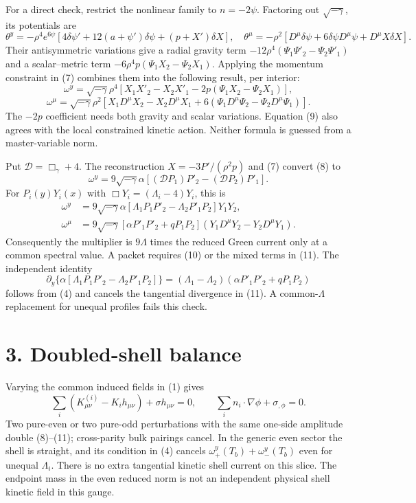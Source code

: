 \documentclass[
  11pt,
]{article}
\begin{document}
For a direct check, restrict the nonlinear family to \(n=-2\psi\).
Factoring out \(\sqrt{-\gamma}\), its potentials are \[
 \theta^y=-\rho^4e^{6\psi}
 [4\delta\psi'+12(a+\psi')\delta\psi+(p+X')\delta X],
 \quad
 \theta^\mu=-\rho^2[D^\mu\delta\psi
                  +6\delta\psi D^\mu\psi+D^\mu X\delta X].
\] Their antisymmetric variations give a radial gravity term
\(-12\rho^4(\Psi_1\Psi'_2-\Psi_2\Psi'_1)\) and a scalar--metric term
\(-6\rho^4p(\Psi_1X_2-\Psi_2X_1)\). Applying the momentum constraint in
(7) combines them into the following result, per interior: \[
 \boxed{\omega^y=\sqrt{-\gamma}\rho^4
 [X_1X'_2-X_2X'_1-2p(\Psi_1X_2-\Psi_2X_1)]},           \tag{8}
\] \[
 \boxed{\omega^\mu=\sqrt{-\gamma}\rho^2
 [X_1D^\mu X_2-X_2D^\mu X_1
  +6(\Psi_1D^\mu\Psi_2-\Psi_2D^\mu\Psi_1)]}.          \tag{9}
\] The \(-2p\) coefficient needs both gravity and scalar variations.
Equation (9) also agrees with the local constrained kinetic action.
Neither formula is guessed from a master-variable norm.

Put \(\mathcal D=\Box_\gamma+4\). The reconstruction
\(X=-3P'/(\rho^2p)\) and (7) convert (8) to \[
 \boxed{\omega^y=9\sqrt{-\gamma}\alpha
 [(\mathcal DP_1)P'_2-(\mathcal DP_2)P'_1]}.             \tag{10}
\] For \(P_i(y)Y_i(x)\) with \(\Box Y_i=(\Lambda_i-4)Y_i\), this is \[
 \begin{split}
 \omega^y&=9\sqrt{-\gamma}\alpha
   [\Lambda_1P_1P'_2-\Lambda_2P'_1P_2]Y_1Y_2,\\
 \omega^\mu&=9\sqrt{-\gamma}
   [\alpha P'_1P'_2+qP_1P_2]
   (Y_1D^\mu Y_2-Y_2D^\mu Y_1).
 \end{split}                                         \tag{11}
\] Consequently the multiplier is \(9\Lambda\) times the reduced Green
current only at a common spectral value. A packet requires (10) or the
mixed terms in (11). The independent identity \[
 \partial_y\{\alpha[\Lambda_1P_1P'_2-\Lambda_2P'_1P_2]\}
 = (\Lambda_1-\Lambda_2)(\alpha P'_1P'_2+qP_1P_2)       \tag{12}
\] follows from (4) and cancels the tangential divergence in (11). A
common-\(\Lambda\) replacement for unequal profiles fails this check.

\section{3. Doubled-shell balance}\label{doubled-shell-balance}

Varying the common induced fields in (1) gives \[
 \sum_i(K^{(i)}_{\mu\nu}-K_i h_{\mu\nu})+\sigma h_{\mu\nu}=0,
 \qquad \sum_i n_i\!\cdot\!\nabla\phi+\sigma_{,\phi}=0. \tag{13}
\] Two pure-even or two pure-odd perturbations with the same one-side
amplitude double (8)--(11); cross-parity bulk pairings cancel. In the
generic even sector the shell is straight, and its condition in (4)
cancels \(\omega^y_+(T_b)+\omega^y_-(T_b)\) even for unequal
\(\Lambda_i\). There is no extra tangential kinetic shell current on
this slice. The endpoint mass in the even reduced norm is not an
independent physical shell kinetic field in this gauge.
\end{document}
